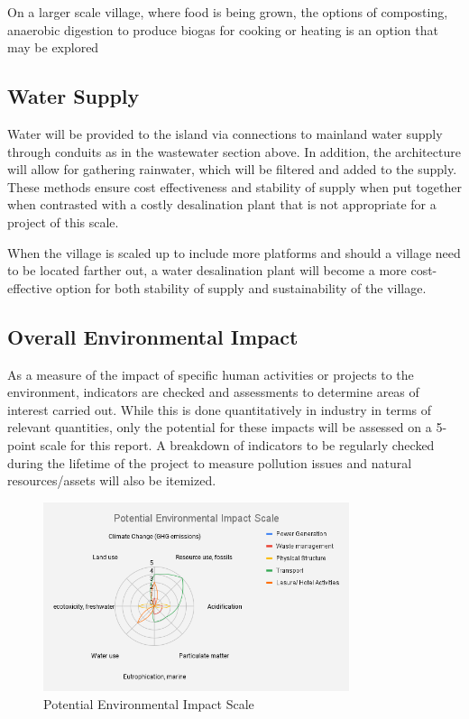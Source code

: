 \documentclass[11pt]{article}
\numberwithin{equation}{section}
\begin{document}
On a larger scale village, where food is being grown, the options of composting, anaerobic digestion to produce biogas for cooking or heating is an option that may be explored

\subsection{Water Supply}
\label{sec:orgca60f7f}
Water will be provided to the island via connections to mainland water supply through conduits as in the wastewater section above. In addition, the architecture will allow for gathering rainwater, which will be filtered and added to the supply. These methods ensure cost effectiveness and stability of supply when put together when contrasted with a costly desalination plant that is not appropriate for a project of this scale.

When the village is scaled up to include more platforms and should a village need to be located farther out, a water desalination plant will become a more cost-effective option for both stability of supply and sustainability of the village.

\subsection{Overall Environmental Impact}
\label{sec:org0309da9}
As a measure of the impact of specific human activities or projects to the environment, indicators are checked and assessments to determine areas of interest carried out. While this is done quantitatively in industry in terms of relevant quantities, only the potential for these impacts will be assessed on a 5-point scale for this report. A breakdown of indicators to be regularly checked during the lifetime of the project to measure pollution issues and natural resources/assets will also be itemized.

\begin{figure}[H]
\centering
\includegraphics[width=0.8\textwidth]{Figures/PotentialEnvironmentalImpactScale.png}
\caption{\label{PotentialEnvironmentalImpactScale}Potential Environmental Impact Scale}
\end{figure}
\end{document}
